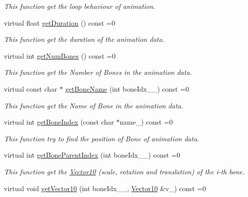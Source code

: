 \begin{DoxyCompactItemize}
\begin{DoxyCompactList}\small\item\em This function get the loop behaviour of animation. \end{DoxyCompactList}\item 
virtual float \hyperlink{class_i_dream_sky_1_1_skeletal_anim_base_a8305d9715321cb9f6a16e6501b72cbd8}{get\+Duration} () const  =0
\begin{DoxyCompactList}\small\item\em This function get the duration of the animation data. \end{DoxyCompactList}\item 
virtual int \hyperlink{class_i_dream_sky_1_1_skeletal_anim_base_a91f5c38d6cb9220dd2353366f09a7664}{get\+Num\+Bones} () const  =0
\begin{DoxyCompactList}\small\item\em This function get the Number of Bones in the animation data. \end{DoxyCompactList}\item 
virtual const char $\ast$ \hyperlink{class_i_dream_sky_1_1_skeletal_anim_base_aa7be65ba6178b3538d78b8ad32504bcf}{get\+Bone\+Name} (int bone\+Idx\+\_\+\+\_\+) const  =0
\begin{DoxyCompactList}\small\item\em This function get the Name of Bone in the animation data. \end{DoxyCompactList}\item 
virtual int \hyperlink{class_i_dream_sky_1_1_skeletal_anim_base_ad4420984124b1ee74338524d460e505a}{get\+Bone\+Index} (const char $\ast$name\+\_\+) const  =0
\begin{DoxyCompactList}\small\item\em This function try to find the position of Bone of animation data. \end{DoxyCompactList}\item 
virtual int \hyperlink{class_i_dream_sky_1_1_skeletal_anim_base_a4335e1a6e463f36b8530564576d531a8}{get\+Bone\+Parent\+Index} (int bone\+Idx\+\_\+\+\_\+) const  =0
\begin{DoxyCompactList}\small\item\em This function get the \hyperlink{class_i_dream_sky_1_1_vector10}{Vector10} (scale, rotation and translation) of the i-\/th bone. \end{DoxyCompactList}\item 
virtual void \hyperlink{class_i_dream_sky_1_1_skeletal_anim_base_a05885a42d51027337a98841e929af057}{get\+Vector10} (int bone\+Idx\+\_\+\+\_\+, \hyperlink{class_i_dream_sky_1_1_vector10}{Vector10} \&v\+\_\+) const  =0

\end{DoxyCompactItemize}
